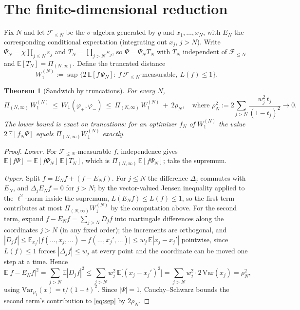 \documentclass[11pt]{amsart}
\newtheorem{theorem}{Theorem}[section]
\theoremstyle{remark}
\newcommand{\E}{\mathbb{E}}
\newcommand{\Lip}{L}
\begin{document}
\section{The finite-dimensional reduction}\label{sec:reduction}

Fix $N$ and let $\mathcal F_{\le N}$ be the $\sigma$-algebra generated by $g$ and
$x_1,\dots,x_N$, with $E_N$ the corresponding conditional expectation (integrating out
$x_j$, $j>N$). Write $\Psi_N=\chi\prod_{j\le N}\varepsilon_j$ and
$T_N=\prod_{j>N}\varepsilon_j$, so $\Psi=\Psi_NT_N$ with $T_N$ independent of
$\mathcal F_{\le N}$ and $\E[T_N]=\Pi_{(N,\infty)}$. Define the truncated distance
\[
W_1^{(N)}:=\sup\bigl\{2\,\E[f\,\Psi_N]:\ f\ \mathcal F_{\le N}\text{-measurable},\
\Lip(f)\le1\bigr\}.
\]

\begin{theorem}[Sandwich by truncations]\label{thm:reduction}
For every $N$,
\[
\Pi_{(N,\infty)}\,W_1^{(N)}\ \le\ W_1(\varphi_+,\varphi_-)\ \le\
\Pi_{(N,\infty)}\,W_1^{(N)}\ +\ 2\rho_N,
\quad\text{where }
\rho_N^2:=2\sum_{j>N}\frac{w_j^2\,t_j}{(1-t_j)^2}\to0 .
\]
The lower bound is exact on truncations: for an optimizer $f_N$ of $W_1^{(N)}$ the value
$2\,\E[f_N\Psi]$ equals $\Pi_{(N,\infty)}W_1^{(N)}$ exactly.
\end{theorem}

\begin{proof}
\emph{Lower.} For $\mathcal F_{\le N}$-measurable $f$, independence gives
$\E[f\Psi]=\E[f\Psi_N]\,\E[T_N]$, which is $\Pi_{(N,\infty)}\,\E[f\Psi_N]$; take the
supremum.

\emph{Upper.} Split $f=E_Nf+(f-E_Nf)$. For $j\le N$ the difference $\Delta_j$ commutes with
$E_N$, and $\Delta_j E_Nf=0$ for $j>N$; by the vector-valued Jensen inequality applied to
the $\ell^2$-norm inside the supremum, $\Lip(E_Nf)\le\Lip(f)\le1$, so the first term
contributes at most $\Pi_{(N,\infty)}W_1^{(N)}$ by the computation above. For the second
term, expand $f-E_Nf=\sum_{j>N}D_jf$ into martingale differences \cite[Ch.~3]{BLM} along the coordinates
$j>N$ (in any fixed order); the increments are orthogonal, and
$|D_jf|\le\E_{x_j'}\bigl|f(\dots,x_j,\dots)-f(\dots,x_j',\dots)\bigr|\le
w_j\,\E|x_j-x_j'|$ pointwise, since $\Lip(f)\le1$ forces $|\Delta_jf|\le w_j$ at every
point and the coordinate can be moved one step at a time. Hence
\[
\E|f-E_Nf|^2=\sum_{j>N}\E|D_jf|^2\le\sum_{j>N}w_j^2\,\E\bigl[(x_j-x_j')^2\bigr]
=\sum_{j>N}w_j^2\cdot2\,\mathrm{Var}(x_j)=\rho_N^2,
\]
using $\mathrm{Var}_{\mu_t}(x)=t/(1-t)^2$. Since $|\Psi|=1$, Cauchy--Schwarz bounds the
second term's contribution to \eqref{eq:sep} by $2\rho_N$.
\end{proof}
\end{document}
